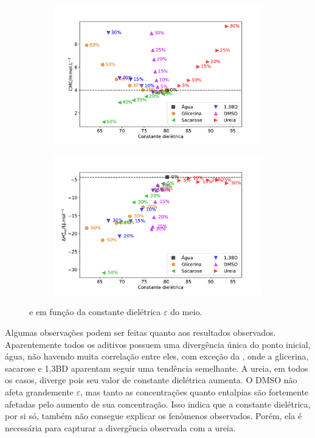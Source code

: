 		\begin{figure}[h]
			\begin{subfigure}[t]{0.5\textwidth}
				\centering
				\includegraphics[width=\textwidth]{imagens/itc/CMC_por_eps}
				\caption{\cmc}
				\label{fig:cmc_por_eps}
			\end{subfigure} %
			\begin{subfigure}[t]{0.5\textwidth}
				\centering
				\includegraphics[width=\textwidth]{imagens/itc/DH_por_eps}
				\caption{\DHmic}
				\label{fig:dh_por_eps}
			\end{subfigure}
			\caption{\cmc{} e \DHmic{} em função da constante dielétrica \(\varepsilon\) do meio.}
			\label{fig:cmc_dh_por_eps}
		\end{figure}
		
		Algumas observações podem ser feitas quanto aos resultados observados. Aparentemente todos os aditivos possuem uma divergência única do ponto inicial, água, não havendo muita correlação entre eles, com exceção da \DHmic{}, onde a glicerina, sacarose e 1,3BD aparentam seguir uma tendência semelhante. A ureia, em todos os casos, diverge pois seu valor de constante dielétrica aumenta. O DMSO não afeta grandemente \(\varepsilon\), mas tanto as concentrações quanto entalpias são fortemente afetadas pelo aumento de sua concentração. Isso indica que a constante dielétrica, por si só, também não consegue explicar os fenômenos observados. Porém, ela é necessária para capturar a divergência observada com a ureia.
		

